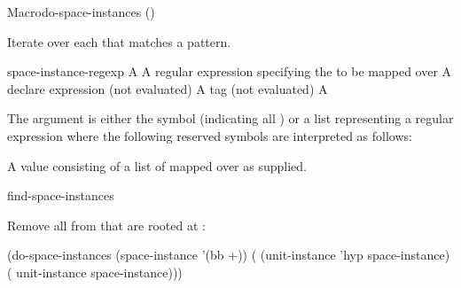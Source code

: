 \documentclass[10pt,twoside,english,pdftex]{article}
\begin{document}
\begin{functiondoc}{Macro}{do-space-instances}%
  {()
    }

\fnsyntax

\fnpurpose Iterate over each  that matches a
 pattern.

\fnpackage {}

\fnmodule {}

\fnargs
\begin{args}{space-instance-regexp}
\arg[var] A 
 A  regular expression
specifying the  to be mapped over
\arg[declaration] A declare expression (not evaluated)
\arg[tag] A  tag (not evaluated)
\arg[form] A 
\end{args}

\fndescription 
The  argument is either the symbol
 (indicating all ) or a list
representing a regular expression where the following reserved symbols
are interpreted as follows:
\spaceinstanceregexp

A  value consisting of a list of
 mapped over as supplied.

\begin{alsos}{find-space-instances}
\end{alsos}

\fnexample 
{}%
%
Remove all   from
 that are rooted at :
%
\W\supp
\begin{example}
  (do-space-instances (space-instance '(bb +))
    ( (unit-instance 'hyp space-instance)
      ( unit-instance space-instance)))
\end{example}

\end{functiondoc}

\end{document}
